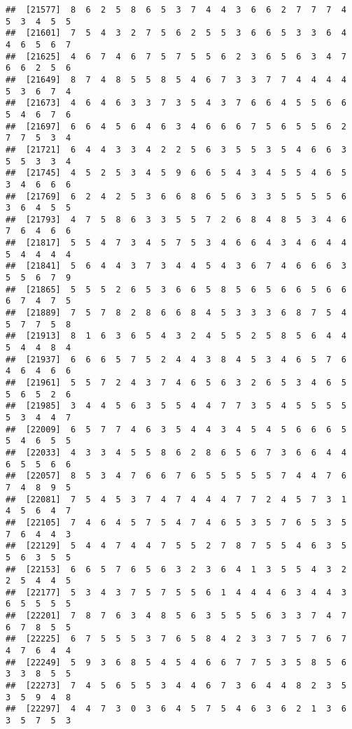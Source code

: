 \documentclass[
]{book}
\begin{document}
\begin{verbatim}
##  [21577]  8  6  2  5  8  6  5  3  7  4  4  3  6  6  2  7  7  7  4  5  3  4  5  5
##  [21601]  7  5  4  3  2  7  5  6  2  5  5  3  6  6  5  3  3  6  4  4  6  5  6  7
##  [21625]  4  6  7  4  6  7  5  7  5  5  6  2  3  6  5  6  3  4  7  6  6  2  5  6
##  [21649]  8  7  4  8  5  5  8  5  4  6  7  3  3  7  7  4  4  4  4  5  3  6  7  4
##  [21673]  4  6  4  6  3  3  7  3  5  4  3  7  6  6  4  5  5  6  6  5  4  6  7  6
##  [21697]  6  6  4  5  6  4  6  3  4  6  6  6  7  5  6  5  5  6  2  7  7  5  3  4
##  [21721]  6  4  4  3  3  4  2  2  5  6  3  5  5  3  5  4  6  6  3  5  5  3  3  4
##  [21745]  4  5  2  5  3  4  5  9  6  6  5  4  3  4  5  5  4  6  5  3  4  6  6  6
##  [21769]  6  2  4  2  5  3  6  6  8  6  5  6  3  3  5  5  5  5  6  3  6  4  5  5
##  [21793]  4  7  5  8  6  3  3  5  5  7  2  6  8  4  8  5  3  4  6  7  6  4  6  6
##  [21817]  5  5  4  7  3  4  5  7  5  3  4  6  6  4  3  4  6  4  4  5  4  4  4  4
##  [21841]  5  6  4  4  3  7  3  4  4  5  4  3  6  7  4  6  6  6  3  5  5  6  7  9
##  [21865]  5  5  5  2  6  5  3  6  6  5  8  5  6  5  6  6  5  6  6  6  7  4  7  5
##  [21889]  7  5  7  8  2  8  6  6  8  4  5  3  3  3  6  8  7  5  4  5  7  7  5  8
##  [21913]  8  1  6  3  6  5  4  3  2  4  5  5  2  5  8  5  6  4  4  5  4  4  8  4
##  [21937]  6  6  6  5  7  5  2  4  4  3  8  4  5  3  4  6  5  7  6  4  6  4  6  6
##  [21961]  5  5  7  2  4  3  7  4  6  5  6  3  2  6  5  3  4  6  5  5  6  5  2  6
##  [21985]  3  4  4  5  6  3  5  5  4  4  7  7  3  5  4  5  5  5  5  5  3  4  4  7
##  [22009]  6  5  7  7  4  6  3  5  4  4  3  4  5  4  5  6  6  6  5  5  4  6  5  5
##  [22033]  4  3  3  4  5  5  8  6  2  8  6  5  6  7  3  6  6  4  4  6  5  5  6  6
##  [22057]  8  5  3  4  7  6  6  7  6  5  5  5  5  5  7  4  4  7  6  7  4  8  9  5
##  [22081]  7  5  4  5  3  7  4  7  4  4  4  7  7  2  4  5  7  3  1  4  5  6  4  7
##  [22105]  7  4  6  4  5  7  5  4  7  4  6  5  3  5  7  6  5  3  5  7  6  4  4  3
##  [22129]  5  4  4  7  4  4  7  5  5  2  7  8  7  5  5  4  6  3  5  5  6  3  5  5
##  [22153]  6  6  5  7  6  5  6  3  2  3  6  4  1  3  5  5  4  3  2  2  5  4  4  5
##  [22177]  5  3  4  3  7  5  7  5  5  6  1  4  4  4  6  3  4  4  3  6  5  5  5  5
##  [22201]  7  8  7  6  3  4  8  5  6  3  5  5  5  6  3  3  7  4  7  6  7  8  5  5
##  [22225]  6  7  5  5  5  3  7  6  5  8  4  2  3  3  7  5  7  6  7  4  7  6  4  4
##  [22249]  5  9  3  6  8  5  4  5  4  6  6  7  7  5  3  5  8  5  6  3  3  8  5  5
##  [22273]  7  4  5  6  5  5  3  4  4  6  7  3  6  4  4  8  2  3  5  3  5  9  4  8
##  [22297]  4  4  7  3  0  3  6  4  5  7  5  4  6  3  6  2  1  3  6  3  5  7  5  3

\end{verbatim}
\end{document}
